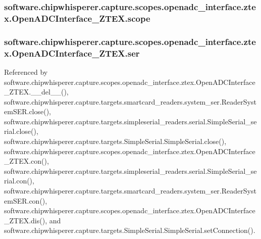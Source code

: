 \subsubsection[{scope}]{\setlength{\rightskip}{0pt plus 5cm}software.\+chipwhisperer.\+capture.\+scopes.\+openadc\+\_\+interface.\+ztex.\+Open\+A\+D\+C\+Interface\+\_\+\+Z\+T\+E\+X.\+scope}\label{classsoftware_1_1chipwhisperer_1_1capture_1_1scopes_1_1openadc__interface_1_1ztex_1_1OpenADCInterface__ZTEX_a800add6aa81f5ed33842ddcf442f1ced}
\hypertarget{classsoftware_1_1chipwhisperer_1_1capture_1_1scopes_1_1openadc__interface_1_1ztex_1_1OpenADCInterface__ZTEX_a5fc5a640b759631918bf66bdc2f86b1b}{}
\subsubsection[{ser}]{\setlength{\rightskip}{0pt plus 5cm}software.\+chipwhisperer.\+capture.\+scopes.\+openadc\+\_\+interface.\+ztex.\+Open\+A\+D\+C\+Interface\+\_\+\+Z\+T\+E\+X.\+ser}\label{classsoftware_1_1chipwhisperer_1_1capture_1_1scopes_1_1openadc__interface_1_1ztex_1_1OpenADCInterface__ZTEX_a5fc5a640b759631918bf66bdc2f86b1b}


Referenced by software.\+chipwhisperer.\+capture.\+scopes.\+openadc\+\_\+interface.\+ztex.\+Open\+A\+D\+C\+Interface\+\_\+\+Z\+T\+E\+X.\+\_\+\+\_\+del\+\_\+\+\_\+(), software.\+chipwhisperer.\+capture.\+targets.\+smartcard\+\_\+readers.\+system\+\_\+ser.\+Reader\+System\+S\+E\+R.\+close(), software.\+chipwhisperer.\+capture.\+targets.\+simpleserial\+\_\+readers.\+serial.\+Simple\+Serial\+\_\+serial.\+close(), software.\+chipwhisperer.\+capture.\+targets.\+Simple\+Serial.\+Simple\+Serial.\+close(), software.\+chipwhisperer.\+capture.\+scopes.\+openadc\+\_\+interface.\+ztex.\+Open\+A\+D\+C\+Interface\+\_\+\+Z\+T\+E\+X.\+con(), software.\+chipwhisperer.\+capture.\+targets.\+simpleserial\+\_\+readers.\+serial.\+Simple\+Serial\+\_\+serial.\+con(), software.\+chipwhisperer.\+capture.\+targets.\+smartcard\+\_\+readers.\+system\+\_\+ser.\+Reader\+System\+S\+E\+R.\+con(), software.\+chipwhisperer.\+capture.\+scopes.\+openadc\+\_\+interface.\+ztex.\+Open\+A\+D\+C\+Interface\+\_\+\+Z\+T\+E\+X.\+dis(), and software.\+chipwhisperer.\+capture.\+targets.\+Simple\+Serial.\+Simple\+Serial.\+set\+Connection().

